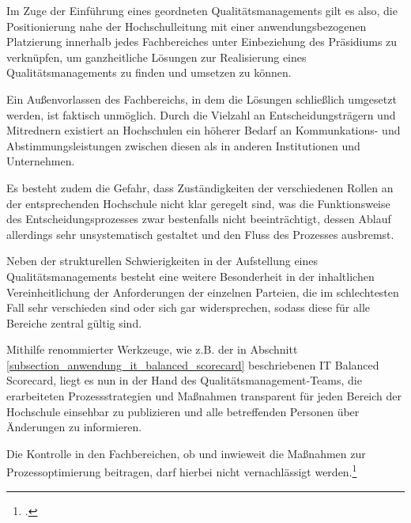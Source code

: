 Im Zuge der Einführung eines geordneten Qualitätsmanagements gilt es also, die Positionierung nahe der 
Hochschulleitung mit einer anwendungsbezogenen Platzierung innerhalb jedes Fachbereiches unter 
Einbeziehung des Präsidiums zu verknüpfen, um ganzheitliche Lösungen zur Realisierung eines 
Qualitätsmanagements zu finden und umsetzen zu können.

Ein Außenvorlassen des Fachbereichs, in dem die Lösungen schließlich umgesetzt werden, ist faktisch 
unmöglich. Durch die Vielzahl an Entscheidungsträgern und Mitrednern existiert an Hochschulen ein höherer 
Bedarf an Kommunkations- und Abstimmungsleistungen zwischen diesen als in anderen Institutionen und 
Unternehmen. 

Es besteht zudem die Gefahr, dass Zuständigkeiten der verschiedenen Rollen an der entsprechenden 
Hochschule nicht klar geregelt sind, was die Funktionsweise des Entscheidungsprozesses zwar bestenfalls 
nicht beeinträchtigt, dessen Ablauf allerdings sehr unsystematisch gestaltet und den Fluss des Prozesses 
ausbremst.

Neben der strukturellen Schwierigkeiten in der Aufstellung eines Qualitätsmanagements besteht eine weitere Besonderheit in der inhaltlichen Vereinheitlichung der Anforderungen der einzelnen Parteien, die im schlechtesten Fall sehr verschieden sind oder sich gar widersprechen, sodass diese für alle Bereiche zentral gültig sind. 

Mithilfe renommierter Werkzeuge, wie z.B. der in Abschnitt \ref{subsection_anwendung_it_balanced_scorecard} beschriebenen IT Balanced Scorecard, liegt es nun in der Hand des Qualitätsmanagement-Teams, die erarbeiteten Prozessstrategien und Maßnahmen transparent für jeden 
Bereich der Hochschule einsehbar zu publizieren und alle betreffenden Personen über Änderungen zu 
informieren. 

Die Kontrolle in den Fachbereichen, ob und inwieweit die 
Maßnahmen zur Prozessoptimierung beitragen, darf hierbei nicht vernachlässigt werden.\footcite{evalag_eckpunkte_2012}

